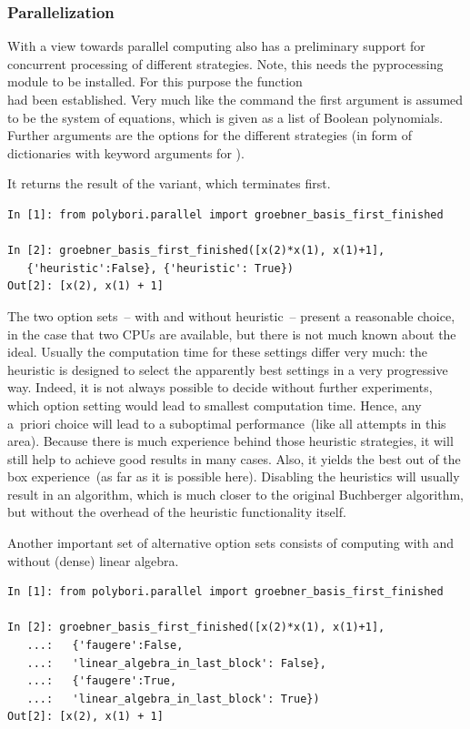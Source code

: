 \subsubsection{Parallelization}
With a view towards parallel computing \PolyBoRi also has a preliminary support
for concurrent processing of  different strategies. Note, this needs the
pyprocessing module to be installed.
For this purpose the function\\
 had been established.
Very much like the command 
the first argument is assumed to be the system of equations,
which is given as a list of Boolean polynomials.
Further arguments are the options for the different strategies (in form of dictionaries with keyword arguments for ).

It returns the result of the variant, which  terminates first.

\begin{lstlisting}
In [1]: from polybori.parallel import groebner_basis_first_finished

In [2]: groebner_basis_first_finished([x(2)*x(1), x(1)+1],
   {'heuristic':False}, {'heuristic': True}) 
Out[2]: [x(2), x(1) + 1]
\end{lstlisting} 
The two option sets~-- with and without heuristic~--
present a reasonable choice, in the case that two CPUs are available, but there
is not much known about the ideal.
Usually the computation time for these settings differ very much:
the heuristic is designed to select the apparently best settings in a very
progressive way.
Indeed, it is not always possible to decide
without further experiments, which option setting would lead to  smallest
computation time. Hence, any a~priori choice will lead to a suboptimal
performance~(like all attempts in this area). 
Because there is much experience behind those heuristic strategies, it will
still help to achieve good results  in many cases. Also, it yields the
best out of the box experience~(as far as it is possible here).
Disabling the heuristics will usually result in an
algorithm, which is much closer to the original Buchberger
algorithm, but without the overhead of the heuristic
functionality itself.

Another important set of alternative option sets consists of computing with and
without (dense) linear algebra.

\begin{lstlisting}
In [1]: from polybori.parallel import groebner_basis_first_finished

In [2]: groebner_basis_first_finished([x(2)*x(1), x(1)+1],
   ...:   {'faugere':False,
   ...:   'linear_algebra_in_last_block': False}, 
   ...:   {'faugere':True,
   ...:   'linear_algebra_in_last_block': True})
Out[2]: [x(2), x(1) + 1]

\end{lstlisting}

